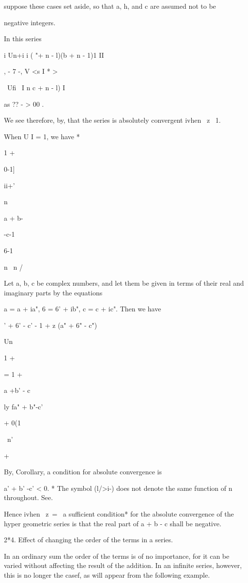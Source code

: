 suppose these cases set aside, so that a, h, and c are assumed not to
be

negative integers.

  In this series

i Un+i i ( "+ n - l)(b + n - 1)1 II

, - 7 -, V <s I * >

\ Ufi \ I n c + n - l) I

as ?? - > 00 .

We see therefore, by, that the series is absolutely convergent
ivhen \ z\ < l, and divergent ivhen | | > 1.

When U I = 1, we have *

1 +

0-1]

ii+'

n

a + b-

-c-1

6-1

n \ n /

Let a, b, c be complex numbers, and let them be given in terms of
their real and imaginary parts by the equations

a = a + ia", 6 = 6' + ib", c = c + ic". Then we have

 ' + 6' - c' - 1 + z (a" + 6" - c")

Un

1 +

= 1 +

a +b' - c

ly fa" + b"-c'

+ 0(1

\ n'

+

  

By, Corollary, a condition for absolute convergence is

a' + b' -c' < 0. * The symbol (l/>i-) does not denote the same
function of n throughout. See.

%
%

Hence ivhen \ z\ = \, a sufficient condition* for the absolute
convergence of the hyper geometric series is that the real part of a +
b - c shall be negative.

2*4. Effect of changing the order of the terms in a series.

In an ordinary sum the order of the terms is of no importance, for it
can be varied without affecting the result of the addition. In an
infinite series, however, this is no longer the casef, as will appear
from the following example.

